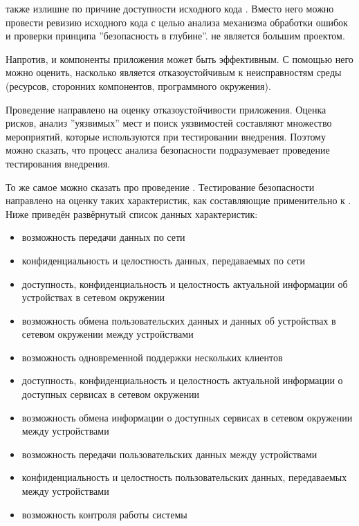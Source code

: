 %
 также излишне по причине доступности исходного кода . 
%
Вместо него можно провести ревизию исходного кода с целью анализа механизма обработки ошибок и проверки принципа ''безопасность в глубине''. 
%
 не является большим проектом. 

%
Напротив,  и компоненты приложения может быть эффективным. 
%
С помощью него можно оценить, насколько  является отказоустойчивым к неисправностям среды (ресурсов, сторонних компонентов, программного окружения). 

%
Проведение  направлено на оценку отказоустойчивости приложения. 
%
Оценка рисков, анализ ''уязвимых'' мест и поиск уязвимостей составляют множество мероприятий, которые используются при тестировании внедрения. 
%
Поэтому можно сказать, что процесс анализа безопасности  подразумевает проведение тестирования внедрения. 

%
То же самое можно сказать про проведение . 
%
Тестирование безопасности  направлено на оценку таких характеристик, как составляющие  применительно к . Ниже приведён развёрнутый список данных характеристик:
\begin{itemize}
	\setlength{\itemsep}{0pt}%

	\item возможность передачи данных по сети
	\item конфиденциальность и целостность данных, передаваемых по сети

	\item доступность, конфиденциальность и целостность актуальной информации об устройствах в сетевом окружении
	\item возможность обмена пользовательских данных и данных об устройствах в сетевом окружении между устройствами
	\item возможность одновременной поддержки нескольких клиентов

	\item доступность, конфиденциальность и целостность актуальной информации о доступных сервисах в сетевом окружении
	\item возможность обмена информации о доступных сервисах в сетевом окружении между устройствами

	\item возможность передачи пользовательских данных между устройствами
	\item конфиденциальность и целостность пользовательских данных, передаваемых между устройствами
	\item возможность контроля работы системы
\end{itemize}

